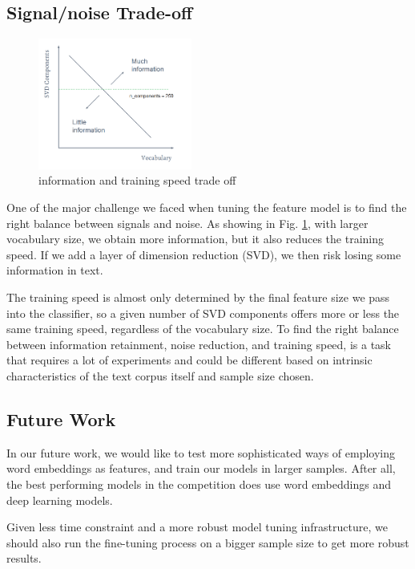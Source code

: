 \documentclass[compsoc]{IEEEtran}
\begin{document}
\subsection{Signal/noise Trade-off}

\begin{figure}[htbp]
\centering
\includegraphics[width=0.45\textwidth]{comp-voca.png}
\caption{information and training speed trade off}
\label{fig:comp-voca}
\end{figure}

One of the major challenge we faced when tuning the feature model is to find the right balance between signals and noise. As showing in Fig. \ref{fig:comp-voca}, with larger vocabulary size, we obtain more information, but it also reduces the training speed. If we add a layer of dimension reduction (SVD), we then risk losing some information in text.

The training speed is almost only determined by the final feature size we pass into the classifier, so a given number of SVD components offers more or less the same training speed, regardless of the vocabulary size. To find the right balance between information retainment, noise reduction, and training speed, is a task that requires a lot of experiments and could be different based on intrinsic characteristics of the text corpus itself and sample size chosen.

\subsection{Future Work}

In our future work, we would like to test more sophisticated ways of employing word embeddings as features, and train our models in larger samples. After all, the best performing models in the competition does use word embeddings and deep learning models.

Given less time constraint and a more robust model tuning infrastructure, we should also run the fine-tuning process on a bigger sample size to get more robust results.
\end{document}
